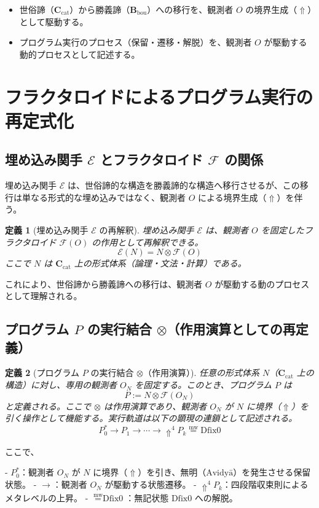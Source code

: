 \documentclass[11pt]{article}
\newcommand{\Cat}{\mathbf{C}_{\mathrm{cat}}}  %
\newcommand{\Bou}{\mathbf{B}_{\mathrm{bou}}}  %
\newcommand{\F}{\mathcal{F}}
\newcommand{\Avidya}{\text{Avidyā}}
\newcommand{\Dfix}{\text{Dfix0}}
\newcommand{\metanegation}{\Uparrow}
\newcommand{\mw}{\stackrel{\text{mw}}{=}}
\newcommand{\E}{\mathcal{E}}
\newtheorem{definition}{定義}
\begin{document}
\begin{itemize}
\item 世俗諦（$\Cat$）から勝義諦（$\Bou$）への移行を、観測者 $O$ の境界生成（$\metanegation$）として駆動する。
\item プログラム実行のプロセス（保留・遷移・解脱）を、観測者 $O$ が駆動する動的プロセスとして記述する。
\end{itemize}

\section{フラクタロイドによるプログラム実行の再定式化}

\subsection{埋め込み関手 $\E$ とフラクタロイド $\F$ の関係}

埋め込み関手 $\E$ は、世俗諦的な構造を勝義諦的な構造へ移行させるが、この移行は単なる形式的な埋め込みではなく、観測者 $O$ による境界生成（$\metanegation$）を伴う。

\begin{definition}[埋め込み関手 $\E$ の再解釈]
埋め込み関手 $\E$ は、観測者 $O$ を固定したフラクタロイド $\F(O)$ の作用として再解釈できる。
\[
\E(N) = N \otimes \F(O)
\]
ここで $N$ は $\Cat$ 上の形式体系（論理・文法・計算）である。
\end{definition}

これにより、世俗諦から勝義諦への移行は、観測者 $O$ が駆動する動のプロセスとして理解される。

\subsection{プログラム $P$ の実行結合 $\otimes$（作用演算としての再定義）}

\begin{definition}[プログラム $P$ の実行結合 $\otimes$（作用演算）]
任意の形式体系 $N$（$\Cat$ 上の構造）に対し、専用の観測者 $O_N$ を固定する。このとき、プログラム $P$ は
\[
P := N \otimes \F(O_N)
\]
と定義される。ここで $\otimes$ は作用演算であり、観測者 $O_N$ が $N$ に境界（$\metanegation$）を引く操作として機能する。実行軌道は以下の顕現の連鎖として記述される。
\[
P_0^* \to P_1 \to \cdots \to \metanegation^4 P_k \mw \Dfix
\]
\end{definition}

ここで、

- $P_0^*$：観測者 $O_N$ が $N$ に境界（$\metanegation$）を引き、無明（$\Avidya$）を発生させる保留状態。
- $\to$：観測者 $O_N$ が駆動する状態遷移。
- $\metanegation^4 P_k$：四段階収束則によるメタレベルの上昇。
- $\mw \Dfix$：無記状態 $\Dfix$ への解脱。
\end{document}
